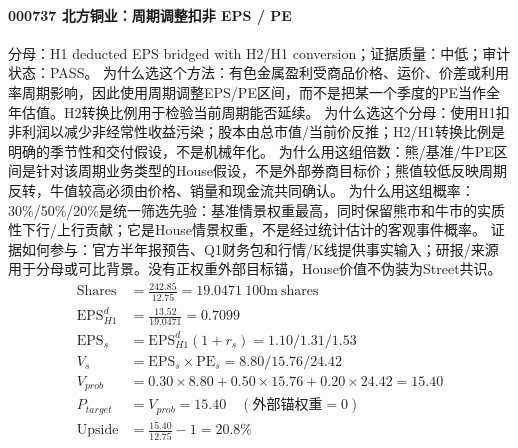 \paragraph{000737 北方铜业：周期调整扣非 EPS / PE}
分母：H1 deducted EPS bridged with H2/H1 conversion；证据质量：中低；审计状态：PASS。
为什么选这个方法：有色金属盈利受商品价格、运价、价差或利用率周期影响，因此使用周期调整EPS/PE区间，而不是把某一个季度的PE当作全年估值。H2转换比例用于检验当前周期能否延续。
为什么选这个分母：使用H1扣非利润以减少非经常性收益污染；股本由总市值/当前价反推；H2/H1转换比例是明确的季节性和交付假设，不是机械年化。
为什么用这组倍数：熊/基准/牛PE区间是针对该周期业务类型的House假设，不是外部券商目标价；熊值较低反映周期反转，牛值较高必须由价格、销量和现金流共同确认。
为什么用这组概率：30\%/50\%/20\%是统一筛选先验：基准情景权重最高，同时保留熊市和牛市的实质性下行/上行贡献；它是House情景权重，不是经过统计估计的客观事件概率。
证据如何参与：官方半年报预告、Q1财务包和行情/K线提供事实输入；研报/来源用于分母或可比背景。没有正权重外部目标锚，House价值不伪装为Street共识。
\begin{align*}
\mathrm{Shares} &= \frac{242.85}{12.75}=19.0471\ \mathrm{100m\ shares}\\
\mathrm{EPS}_{H1}^d &= \frac{13.52}{19.0471}=0.7099\\
\mathrm{EPS}_s &= \mathrm{EPS}_{H1}^d(1+r_s)=1.10/1.31/1.53\\
V_s &= \mathrm{EPS}_s\times \mathrm{PE}_s=8.80/15.76/24.42\\
V_{prob} &= 0.30\times 8.80+0.50\times 15.76+0.20\times 24.42=15.40\\
P_{target} &= V_{prob}=15.40\quad(\text{外部锚权重}=0)\\
\mathrm{Upside} &= \frac{15.40}{12.75}-1=20.8\%\\
\end{align*}

